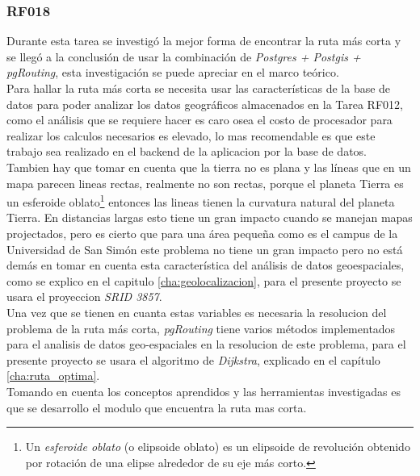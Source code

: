 \subsubsection{RF018}
\label{subs:RF018}

Durante esta tarea se investigó la mejor forma de encontrar la ruta más corta y se llegó a la conclusión de usar la combinación de \emph{Postgres + Postgis + pgRouting}, esta investigación se puede apreciar en el marco teórico.\\

Para hallar la ruta más corta se necesita usar las características de la base de datos para poder analizar los datos geográficos almacenados en la Tarea RF012, como el análisis que se requiere hacer es caro osea el costo de procesador para realizar los calculos necesarios es elevado, lo mas recomendable es que este trabajo sea realizado en el backend de la aplicacion por la base de datos.\\

Tambien hay que tomar en cuenta que la tierra no es plana y las líneas que en un mapa parecen lineas rectas, realmente no son rectas, porque el planeta Tierra es un esferoide oblato\footnote{Un \emph{esferoide oblato} (o elipsoide oblato) es un elipsoide de revolución obtenido por rotación de una elipse alrededor de su eje más corto.} entonces las lineas tienen la curvatura natural del planeta Tierra. En distancias largas esto tiene un gran impacto cuando se manejan mapas projectados, pero es cierto que para una área pequeña como es el campus de la Universidad de San Simón este problema no tiene un gran impacto pero no está demás en tomar en cuenta esta característica del análisis de datos geoespaciales, como se explico en el capitulo \ref{cha:geolocalizacion}, para el presente proyecto se usara el proyeccion \emph{SRID 3857}.\\

Una vez que se tienen en cuanta estas variables es necesaria la resolucion del problema de la ruta más corta, \emph{pgRouting} tiene varios métodos implementados para el analisis de datos geo-espaciales en la resolucion de este problema, para el presente proyecto se usara el algoritmo de \emph{Dijkstra}, explicado en el capítulo \ref{cha:ruta_optima}.\\

Tomando en cuenta los conceptos aprendidos y las herramientas investigadas es que se desarrollo el modulo que encuentra la ruta mas corta.

